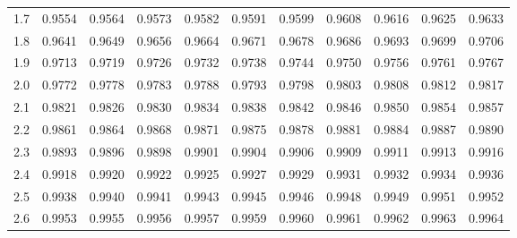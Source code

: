 \documentclass[11pt]{article}
\begin{document}
\begin{table}[h]
\begin{center}
\begin{tabular}{c | rrrrr | rrrrr |}
  1.7 & \scriptsize{0.9554} & \scriptsize{0.9564} & \scriptsize{0.9573} & \scriptsize{0.9582} & \scriptsize{0.9591} & \scriptsize{0.9599} & \scriptsize{0.9608} & \scriptsize{0.9616} & \scriptsize{0.9625} & \scriptsize{0.9633} \\
  1.8 & \scriptsize{0.9641} & \scriptsize{0.9649} & \scriptsize{0.9656} & \scriptsize{0.9664} & \scriptsize{0.9671} & \scriptsize{0.9678} & \scriptsize{0.9686} & \scriptsize{0.9693} & \scriptsize{0.9699} & \scriptsize{0.9706} \\
  1.9 & \scriptsize{0.9713} & \scriptsize{0.9719} & \scriptsize{0.9726} & \scriptsize{0.9732} & \scriptsize{0.9738} & \scriptsize{0.9744} & \scriptsize{0.9750} & \scriptsize{0.9756} & \scriptsize{0.9761} & \scriptsize{0.9767} \\
  \hline
  \hline
  2.0 & \scriptsize{0.9772} & \scriptsize{0.9778} & \scriptsize{0.9783} & \scriptsize{0.9788} & \scriptsize{0.9793} & \scriptsize{0.9798} & \scriptsize{0.9803} & \scriptsize{0.9808} & \scriptsize{0.9812} & \scriptsize{0.9817} \\
  2.1 & \scriptsize{0.9821} & \scriptsize{0.9826} & \scriptsize{0.9830} & \scriptsize{0.9834} & \scriptsize{0.9838} & \scriptsize{0.9842} & \scriptsize{0.9846} & \scriptsize{0.9850} & \scriptsize{0.9854} & \scriptsize{0.9857} \\
  2.2 & \scriptsize{0.9861} & \scriptsize{0.9864} & \scriptsize{0.9868} & \scriptsize{0.9871} & \scriptsize{0.9875} & \scriptsize{0.9878} & \scriptsize{0.9881} & \scriptsize{0.9884} & \scriptsize{0.9887} & \scriptsize{0.9890} \\
  2.3 & \scriptsize{0.9893} & \scriptsize{0.9896} & \scriptsize{0.9898} & \scriptsize{0.9901} & \scriptsize{0.9904} & \scriptsize{0.9906} & \scriptsize{0.9909} & \scriptsize{0.9911} & \scriptsize{0.9913} & \scriptsize{0.9916} \\
  2.4 & \scriptsize{0.9918} & \scriptsize{0.9920} & \scriptsize{0.9922} & \scriptsize{0.9925} & \scriptsize{0.9927} & \scriptsize{0.9929} & \scriptsize{0.9931} & \scriptsize{0.9932} & \scriptsize{0.9934} & \scriptsize{0.9936} \\
  \hline
  2.5 & \scriptsize{0.9938} & \scriptsize{0.9940} & \scriptsize{0.9941} & \scriptsize{0.9943} & \scriptsize{0.9945} & \scriptsize{0.9946} & \scriptsize{0.9948} & \scriptsize{0.9949} & \scriptsize{0.9951} & \scriptsize{0.9952} \\
  2.6 & \scriptsize{0.9953} & \scriptsize{0.9955} & \scriptsize{0.9956} & \scriptsize{0.9957} & \scriptsize{0.9959} & \scriptsize{0.9960} & \scriptsize{0.9961} & \scriptsize{0.9962} & \scriptsize{0.9963} & \scriptsize{0.9964} \\

\end{tabular}
\end{center}
\end{table}
\end{document}
